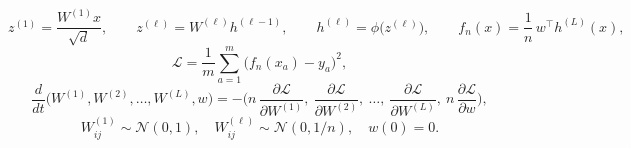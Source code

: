 \documentclass[12pt,border=2pt]{standalone}
\begin{document}
\begin{minipage}{7.4in}
\[
 z^{(1)}=\frac{W^{(1)}x}{\sqrt d},\qquad
 z^{(\ell)}=W^{(\ell)}h^{(\ell-1)},\qquad
 h^{(\ell)}=\phi\big(z^{(\ell)}\big),\qquad
 f_n(x)=\frac1n\,w^\top h^{(L)}(x),
\]
\[
 \mathcal L=\frac1m\sum_{a=1}^m\big(f_n(x_a)-y_a\big)^2,
\]
\[
 \frac{d}{dt}\big(W^{(1)},W^{(2)},\dots,W^{(L)},w\big)
 =-\Big(n\,\frac{\partial\mathcal L}{\partial W^{(1)}},\ \frac{\partial\mathcal L}{\partial W^{(2)}},\ \dots,\
 \frac{\partial\mathcal L}{\partial W^{(L)}},\ n\,\frac{\partial\mathcal L}{\partial w}\Big),
\]
\[
 W^{(1)}_{ij}\sim\mathcal N(0,1),\quad
 W^{(\ell)}_{ij}\sim\mathcal N(0,1/n),\quad
 w(0)=0.
\]
\end{minipage}
\end{document}
